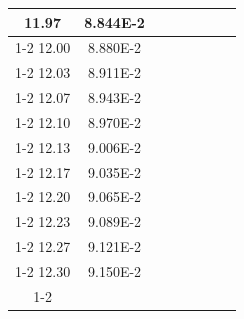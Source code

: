 \documentclass[article,12pt]{elsarticle}
\begin{document}
\begin{longtable}[c]{|c|c|cccccc}
11.97    & 8.844E-2  &                       &                              &                            &                       &                              &                               \\ \cline{1-2}
12.00    & 8.880E-2  &                       &                              &                            &                       &                              &                               \\ \cline{1-2}
12.03    & 8.911E-2  &                       &                              &                            &                       &                              &                               \\ \cline{1-2}
12.07    & 8.943E-2  &                       &                              &                            &                       &                              &                               \\ \cline{1-2}
12.10    & 8.970E-2  &                       &                              &                            &                       &                              &                               \\ \cline{1-2}
12.13    & 9.006E-2  &                       &                              &                            &                       &                              &                               \\ \cline{1-2}
12.17    & 9.035E-2  &                       &                              &                            &                       &                              &                               \\ \cline{1-2}
12.20    & 9.065E-2  &                       &                              &                            &                       &                              &                               \\ \cline{1-2}
12.23    & 9.089E-2  &                       &                              &                            &                       &                              &                               \\ \cline{1-2}
12.27    & 9.121E-2  &                       &                              &                            &                       &                              &                               \\ \cline{1-2}
12.30    & 9.150E-2  &                       &                              &                            &                       &                              &                               \\ \cline{1-2}

\end{longtable}
\end{document}
